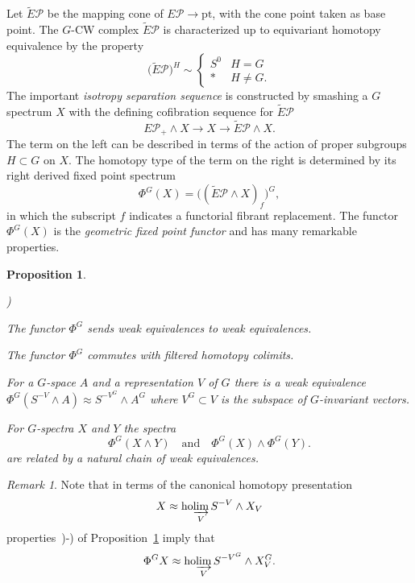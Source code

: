 \documentclass{amsart}
\newtheorem{prop}[equation]{Proposition}
\newtheorem{rem}[equation]{Remark}
\theoremstyle{definition}
\theoremstyle{remark}
\newtheorem{rem}[equation]{Remark}
\newcounter{thmItem}
\newcommand{\thmListItem}[1]{\rm \romannumeral#1)}
\newenvironment{thmList}{\begin{list}%
{\rm \roman{thmItem})}{\usecounter{thmItem}
\setlength{\labelwidth}{2em}
\setlength{\itemindent}{2em}
\setlength{\leftmargin}{0pt}
\setlength{\listparindent}{0pt}
\setlength{\parsep}{0pt}
\setlength{\partopsep}{0pt}
\setlength{\itemsep}{\medskipamount}
\setlength{\topsep}{\medskipamount}
}}{\end{list}}
\DeclareMathOperator{\ho}{ho}
\newcommand{\gfp}[1]{\Phi^{#1}}
\newcommand{\phig}{\gfp{G}}
\newcommand{\hocolim}{\ho\!\varinjlim}
\newcommand{\pfamily}{\mathcal P}
\begin{document}
Let $\tilde E\pfamily$ be the mapping cone of $E\pfamily\to
\text{pt}$, with the cone point taken as base point.
The $G$-CW complex $\tilde E\pfamily$ is characterized up to equivariant
homotopy equivalence by the property
\[
\big(\tilde E\pfamily\big)^{H} \sim 
\begin{cases}
S^{0}& H=G \\
\ast & H\ne G.
\end{cases}
\]
The important {\em isotropy separation sequence} is constructed by
smashing a $G$ spectrum $X$ with the defining cofibration
sequence for $\tilde E\pfamily$
\begin{equation}
\label{eq:3}
E\pfamily_{+}\wedge X \to X \to \tilde E\pfamily \wedge X.
\end{equation}
The term on the left can be described in terms of the action of proper
subgroups $H\subset G$ on $X$.  The homotopy type of the term on the
right is determined by its right derived fixed point spectrum
\[
\phig(X) = \big((\tilde E\pfamily\wedge X)_{f}\big)^{G},
\]
in which the subscript $f$ indicates a functorial fibrant replacement.
The functor $\phig(X)$ is the {\em geometric fixed point functor} and
has many remarkable properties.

\begin{prop}
\label{thm:202}
\begin{thmList}
\item The functor $\phig$ sends weak equivalences to weak equivalences.
\item The functor $\phig$ commutes with filtered homotopy colimits.
\item For a $G$-space $A$ and a representation $V$ of $G$ there is a
weak equivalence $\phig(S^{-V}\wedge A) \approx S^{-V^{G}}\wedge A^{G}$
where $V^{G}\subset V$ is the subspace of $G$-invariant vectors.
\item For $G$-spectra $X$ and $Y$ the spectra
\[
\phig(X\wedge Y) \quad\text{and}\quad \phig(X)\wedge \phig(Y).
\]
are related by a natural chain of weak equivalences.
\end{thmList}
\end{prop}

\begin{rem}
\label{rem:2}
Note that in terms of the canonical homotopy presentation
\[
X\approx \hocolim_{V} S^{-V}\wedge X_{V}
\]
properties~\thmListItem{1}-\thmListItem{3} of
Proposition~\ref{thm:202} imply that
\begin{equation}\label{eq:35}
\phig X \approx \hocolim_{V} S^{-V^{G}} \wedge X_{V}^{G}.
\end{equation}
\end{rem}
\end{document}
